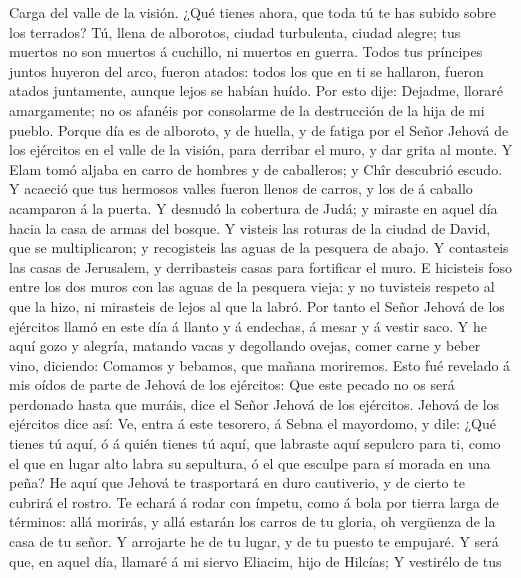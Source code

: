 Carga del valle de la visión. ¿Qué tienes ahora, que toda
tú te has subido sobre los terrados?  Tú, llena de
alborotos, ciudad turbulenta, ciudad alegre; tus muertos no son muertos
á cuchillo, ni muertos en guerra.  Todos tus príncipes
juntos huyeron del arco, fueron atados: todos los que en ti se hallaron,
fueron atados juntamente, aunque lejos se habían huído. 
Por esto dije: Dejadme, lloraré amargamente; no os afanéis por
consolarme de la destrucción de la hija de mi pueblo. 
Porque día es de alboroto, y de huella, y de fatiga por el Señor Jehová
de los ejércitos en el valle de la visión, para derribar el muro, y dar
grita al monte.  Y Elam tomó aljaba en carro de hombres y
de caballeros; y Chîr descubrió escudo.  Y acaeció que tus
hermosos valles fueron llenos de carros, y los de á caballo acamparon á
la puerta.  Y desnudó la cobertura de Judá; y miraste en
aquel día hacia la casa de armas del bosque.  Y visteis
las roturas de la ciudad de David, que se multiplicaron; y recogisteis
las aguas de la pesquera de abajo.  Y contasteis las
casas de Jerusalem, y derribasteis casas para fortificar el muro.
 E hicisteis foso entre los dos muros con las aguas de la
pesquera vieja: y no tuvisteis respeto al que la hizo, ni mirasteis de
lejos al que la labró.  Por tanto el Señor Jehová de los
ejércitos llamó en este día á llanto y á endechas, á mesar y á vestir
saco.  Y he aquí gozo y alegría, matando vacas y
degollando ovejas, comer carne y beber vino, diciendo: Comamos y
bebamos, que mañana moriremos.  Esto fué revelado á mis
oídos de parte de Jehová de los ejércitos: Que este pecado no os será
perdonado hasta que muráis, dice el Señor Jehová de los ejércitos.
 Jehová de los ejércitos dice así: Ve, entra á este
tesorero, á Sebna el mayordomo, y dile:  ¿Qué tienes tú
aquí, ó á quién tienes tú aquí, que labraste aquí sepulcro para ti, como
el que en lugar alto labra su sepultura, ó el que esculpe para sí morada
en una peña?  He aquí que Jehová te trasportará en duro
cautiverio, y de cierto te cubrirá el rostro.  Te echará
á rodar con ímpetu, como á bola por tierra larga de términos: allá
morirás, y allá estarán los carros de tu gloria, oh vergüenza de la casa
de tu señor.  Y arrojarte he de tu lugar, y de tu puesto
te empujaré.  Y será que, en aquel día, llamaré á mi
siervo Eliacim, hijo de Hilcías;  Y vestirélo de tus
